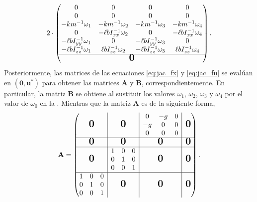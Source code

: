 \begin{align}
 2 \cdot 
    \begin{pmatrix}
    \begin{matrix}
        0 & 0 & 0 & 0 \\
        0 & 0 & 0 & 0 \\
        -km^{-1}\omega_1 & -km^{-1}\omega_2 & -km^{-1}\omega_3 & -km^{-1}\omega_4 \\
        0 & -\ell bI_{xx}^{-1}\omega_2 & 0 & 
        -\ell bI_{xx}^{-1}\omega_4\\
        -\ell bI_{yy}^{-1}\omega_1 & 0 & -\ell bI_{yy}^{-1}\omega_3 & 0 \\
        -\ell bI_{zz}^{-1}\omega_1 & 
        \ell bI_{zz}^{-1}\omega_2 & 
        -\ell bI_{zz}^{-1}\omega_3 & 
        \ell bI_{zz}^{-1}\omega_4
        \end{matrix}
        \\ 
    \hline 
    \mbox{\normalfont\Large\bfseries 0}
    \end{pmatrix}.
    \label{eq:jac_fu}
\end{align}
Posteriormente, las matrices de las ecuaciones \ref{eq:jac_fx} y \ref{eq:jac_fu} se evalúan en $(\mathbf{0}, \mathbf{u}^{*})$ para obtener las matrices $\mathbf{A}$ y $\mathbf{B}$, correspondientemente.
En particular, la matriz $\mathbf{B}$ se obtiene al sustituir los valores $\omega_1$, $\omega_2$, $\omega_3$ y $\omega_4$ por el valor de $\omega_0$ en la . Mientras que la matriz $\mathbf{A}$ es de la siguiente forma,
\begin{align} \label{eq:A}
    \mathbf{A} = 
    \begin{pmatrix}
        \bigzero & \rvline & \bigzero & \rvline & 
        \begin{matrix}
            0 & -g & 0 \\
            -g & 0 & 0 \\
            0 & 0 & 0 
        \end{matrix} & \rvline & \bigzero \\
        \hline
        \bigzero & \rvline & \bigzero & \rvline & 
        \bigzero & \rvline & \bigzero \\
        \hline 
        \bigzero & \rvline & 
        \begin{matrix}
            1 & 0 & 0 \\
            0 & 1 & 0 \\
            0 & 0 & 1
        \end{matrix} & \rvline & \bigzero & \rvline
        & \bigzero \\
        \hline 
        \begin{matrix}
            1 & 0 & 0 \\
            0 & 1 & 0 \\
            0 & 0 & 1
        \end{matrix} & \rvline & \bigzero & \rvline & \bigzero & \rvline & \bigzero \\
    \end{pmatrix}.
\end{align}

